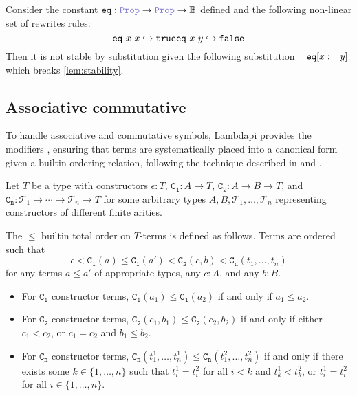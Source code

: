 \begin{example}
Consider the constant $\kw{eq}: \prop \ra \prop \ra \B$ defined  and the following non-linear set of rewrites rules:
\[
    \texttt{\upshape{eq}}~x~x \hookrightarrow \texttt{\upshape{true}}\\
    \texttt{\upshape{eq}}~x~y \hookrightarrow \texttt{\upshape{false}}
\]
Then it is not stable by substitution given the following substitution $\vdash\texttt{\upshape{eq}}[x := y]$ which breaks \cref{lem:stability}.
\end{example}

\subsection{Associative commutative}

To handle associative and commutative symbols, Lambdapi provides the modifiers ,
ensuring that terms are systematically placed into a canonical form given a builtin ordering relation, following the technique described in \cite{ACorigin} and \cite[\S 5]{univAC}.

\begin{definition}\label{def:builtin-order-relation}
Let $T$ be a type with constructors $\epsilon : T$, $\mathtt{C_1} : A \to T$, $\mathtt{C_2} : A \to B \to T$, and $\mathtt{C_n} : \mathcal{T}_1 \to \cdots \to \mathcal{T}_n \to T$ for some arbitrary types $A, B, \mathcal{T}_1, \ldots, \mathcal{T}_n$ representing constructors of different finite arities.

The $\leq$ builtin total order on $T$-terms is defined as follows. Terms are ordered such that
\[
  \epsilon < \mathtt{C_1}(a) \leq \mathtt{C_1}(a') < \mathtt{C_2}(c, b) < \mathtt{C_n}(t_1, \ldots, t_n)
\]
for any terms $a \leq a'$ of appropriate types, any $c : A$, and any $b : B$.

\begin{itemize}
\item For $\mathtt{C_1}$ constructor terms, $\mathtt{C_1}(a_1) \leq \mathtt{C_1}(a_2)$ if and only if $a_1 \leq a_2$.

  \item For $\mathtt{C_2}$ constructor terms, $\mathtt{C_2}(c_1, b_1) \leq \mathtt{C_2}(c_2, b_2)$ if and only if either $c_1 < c_2$, or $c_1 = c_2$ and $b_1 \leq b_2$.

  \item For $\mathtt{C_n}$ constructor terms, $\mathtt{C_n}(t_1^{1}, \ldots, t_n^{1}) \leq \mathtt{C_n}(t_1^{2}, \ldots, t_n^{2})$ if and only if there exists some $k \in \{1, \ldots, n\}$ such that $t_i^{1} = t_i^{2}$ for all $i < k$ and $t_k^{1} < t_k^{2}$, or $t_i^{1} = t_i^{2}$ for all $i \in \{1, \ldots, n\}$.
\end{itemize}
\end{definition}


